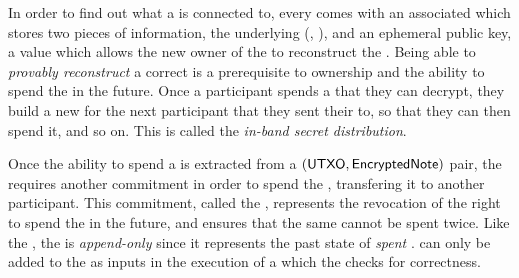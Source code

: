 
In order to find out what \SecretAsset{} a \UTXO{} is connected to, every \UTXO{} comes with an associated \EncryptedNote{} which stores two pieces of information, the underlying (\AssetId{}, \AssetValue{}), and an ephemeral public key, a value which allows the new owner of the \SecretAsset{} to reconstruct the \UTXO{}. Being able to \emph{provably reconstruct} a correct \UTXO{} is a prerequisite to ownership and the ability to spend the \SecretAsset{} in the future. Once a participant spends a \SecretAsset{} that they can decrypt, they build a new \EncryptedNote{} for the next participant that they sent their  to, so that they can then spend it, and so on. This is called the \emph{in-band secret distribution}.


Once the ability to spend a \SecretAsset{} is extracted from a $({\textsf{UTXO}}, {\textsf{EncryptedNote}})$ pair, the \ShieldedAssetPool{} requires another commitment in order to spend the \SecretAsset{}, transfering it to another participant. This commitment, called the \VoidNumber{}, represents the revocation of the right to spend the \SecretAsset{} in the future, and ensures that the same \SecretAsset{} cannot be spent twice. Like the \TUTXOSet{}, the \VoidNumberSet{} is \emph{append-only} since it represents the past state of \emph{spent} .  can only be added to the \VoidNumberSet{} as inputs in the execution of a \Transfer{} which the \Ledger{} checks for correctness.

